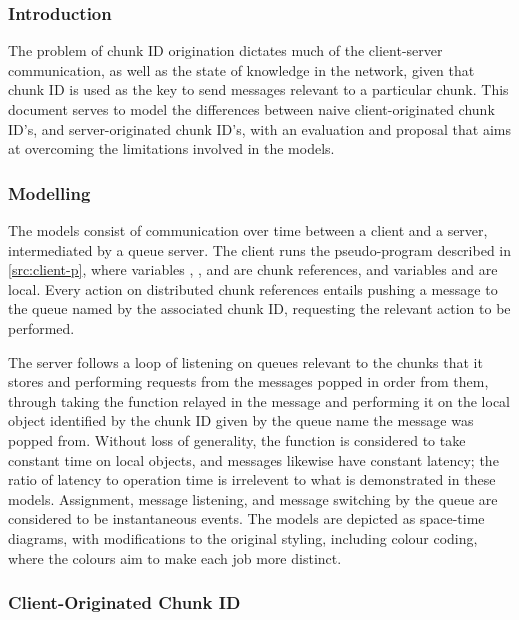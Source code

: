 \subsubsection{Introduction}

The problem of chunk ID origination 
dictates much of the client-server communication, as well as the state of
knowledge in the network, given that chunk ID is used as the key to send
messages relevant to a particular chunk.
This document serves to model the differences between naive client-originated
chunk ID's, and server-originated chunk ID's, with an evaluation and proposal
that aims at overcoming the limitations involved in the models.

\subsubsection{Modelling}\label{sec:cid-model}

The models consist of communication over time between a client and a server,
intermediated by a queue server.
The client runs the pseudo-program described in \cref{src:client-p},
where variables , , and  are chunk references,
and variables  and  are local. 
Every action on distributed chunk references entails pushing a  message to the
queue named by the associated chunk ID, requesting the relevant action to be
performed.


The server follows a loop of listening on queues relevant to the chunks that it
stores and performing requests from the messages popped in order from them,
through taking the function relayed in the message and performing it on the
local object identified by the chunk ID given by the queue name the message was
popped from.
Without loss of generality, the function  is considered to take
constant time on local objects, and messages likewise have constant latency;
the ratio of latency to operation time is irrelevent to what is demonstrated in
these models.
Assignment, message listening, and message switching by the queue are
considered to be instantaneous events.
The models are depicted as space-time diagrams, with modifications to the
original styling\cite{lamport1978ordering}, including colour coding, where the
colours aim to make each job more distinct.

\subsubsection{Client-Originated Chunk ID}

